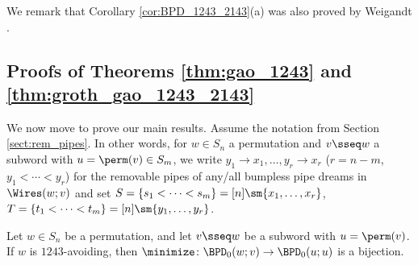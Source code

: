 We remark that Corollary \ref{cor:BPD_1243_2143}(a) was also proved by Weigandt \cite{Wei21}.



\subsection{Proofs of Theorems \ref{thm:gao_1243} and \ref{thm:groth_gao_1243_2143}}

We now move to prove our main results.
Assume the notation from Section \ref{sect:rem_pipes}.
In other words, for $w\in S_n$ a permutation and $v\sseq w$ a subword with $u = \perm(v) \in S_m$,
we write $y_1\to x_1,\dots,y_r\to x_r$ ($r = n-m$, $y_1<\cdots<y_r$) for the removable pipes of any/all bumpless pipe dreams in $\Wires(w;v)$ and set $S = \{s_1<\cdots<s_m\} = [n]\sm \{x_1,\dots,x_r\}$, $T = \{t_1<\cdots<t_m\} = [n]\sm \{y_1,\dots,y_r\}$.

\begin{proposition}
\label{prop:bpd_bij_1243}
    Let $w\in S_n$ be a permutation, and let $v\sseq w$ be a subword with $u = \perm(v)$.
    If $w$ is $1243$-avoiding, then
    $\minimize\colon \BPD_0(w;v) \to \BPD_0(u;u)$ is a bijection.
\end{proposition}

